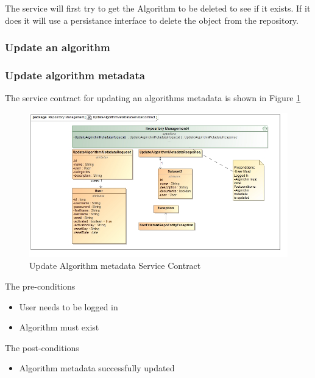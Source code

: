  The service will first try to get the Algorithm to be deleted to see if it
 exists. If it does it will use a persistance interface to delete the object
 from the repository.

\subsubsection {Update an algorithm}

\subsubsection {Update algorithm metadata}
The service contract for updating an algorithms metadata is shown in Figure \ref{fig:updateAlgorithmMetadataServiceContract}
\begin{figure}[H]
	\begin{center}
		\includegraphics[scale=0.6]{../Diagrams and Charts/Test Data/UpdateAlgorithmMetadataServiceContract.jpg}
		\caption{Update Algorithm metadata Service Contract}
		\label{fig:updateAlgorithmMetadataServiceContract}
	\end{center}
	
\end{figure}

The pre-conditions
\begin{itemize}
	\item User needs to be logged in
	\item Algorithm must exist
\end{itemize}

The post-conditions
\begin{itemize}
	\item Algorithm metadata successfully updated
\end{itemize}

